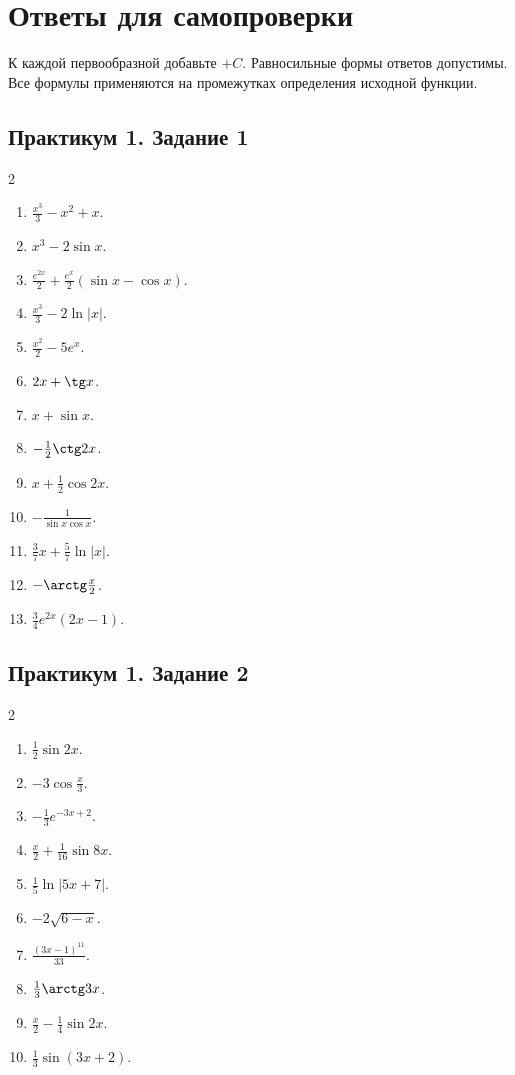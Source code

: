 \clearpage
\section*{Ответы для самопроверки}
К каждой первообразной добавьте $+C$. Равносильные формы ответов допустимы. Все формулы применяются на промежутках определения исходной функции.
\subsection*{Практикум 1. Задание 1}
\begin{multicols}{2}
\begin{enumerate}
\item $\frac{x^3}{3}-x^2+x$.
\item $x^3-2\sin x$.
\item $\frac{e^{2x}}2+\frac{e^x}{2}(\sin x-\cos x)$.
\item $\frac{x^3}{3}-2\ln|x|$.
\item $\frac{x^2}{2}-5e^x$.
\item $2x+\tg x$.
\item $x+\sin x$.
\item $-\frac{1}{2}\ctg 2x$.
\item $x+\frac{1}{2}\cos2x$.
\item $-\frac{1}{\sin x\cos x}$.
\item $\frac{3}{7}x+\frac{5}{7}\ln|x|$.
\item $-\arctg\frac{x}{2}$.
\item $\frac{3}{4}e^{2x}(2x-1)$.
\end{enumerate}
\end{multicols}
\subsection*{Практикум 1. Задание 2}
\begin{multicols}{2}
\begin{enumerate}
\item $\frac{1}{2}\sin2x$.
\item $-3\cos\frac{x}{3}$.
\item $-\frac{1}{3}e^{-3x+2}$.
\item $\frac{x}{2}+\frac{1}{16}\sin8x$.
\item $\frac{1}{5}\ln|5x+7|$.
\item $-2\sqrt{6-x}$.
\item $\frac{(3x-1)^{11}}{33}$.
\item $\frac{1}{3}\arctg3x$.
\item $\frac{x}{2}-\frac{1}{4}\sin2x$.
\item $\frac{1}{3}\sin(3x+2)$.
\end{enumerate}
\end{multicols}
